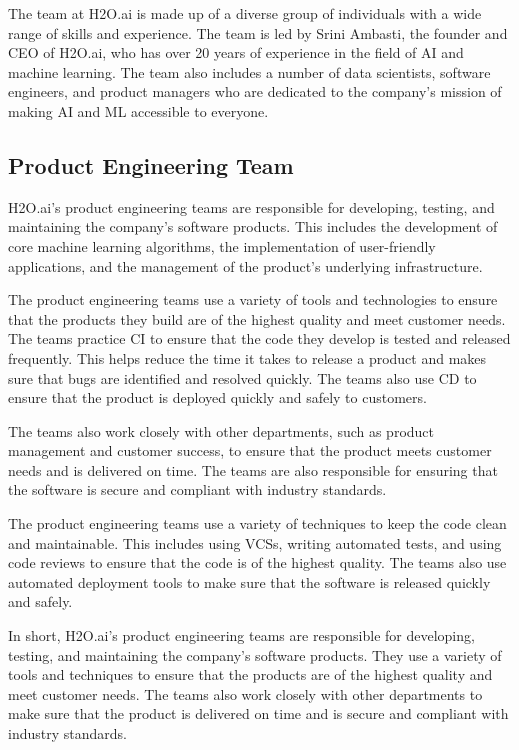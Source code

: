 \documentclass[12pt,a4paper]{report}
\begin{document}
The team at H2O.ai is made up of a diverse group of individuals with a wide range of 
skills and experience. The team is led by Srini Ambasti, the founder and CEO of H2O.ai, 
who has over 20 years of experience in the field of \ac{AI} and machine learning. 
The team also includes a number of data scientists, software engineers, and product managers 
who are dedicated to the company's mission of making AI and ML accessible to everyone.

\subsection {Product Engineering Team}
H2O.ai's product engineering teams are responsible for developing, testing, and maintaining the company's software products. This includes the development of core machine learning algorithms, the implementation of user-friendly applications, and the management of the product's underlying infrastructure.

The product engineering teams use a variety of tools and technologies to ensure that the products they build are of the highest quality and meet customer needs. The teams practice \ac{CI} to ensure that the code they develop is tested and released frequently. This helps reduce the time it takes to release a product and makes sure that bugs are identified and resolved quickly. The teams also use \ac{CD} to ensure that the product is deployed quickly and safely to customers.

The teams also work closely with other departments, such as product management and customer success, to ensure that the product meets customer needs and is delivered on time. The teams are also responsible for ensuring that the software is secure and compliant with industry standards.

The product engineering teams use a variety of techniques to keep the code clean and maintainable. This includes using \ac{VCS}s, writing automated tests, and using code reviews to ensure that the code is of the highest quality. The teams also use automated deployment tools to make sure that the software is released quickly and safely.

In short, H2O.ai's product engineering teams are responsible for developing, testing, and maintaining the company's software products. They use a variety of tools and techniques to ensure that the products are of the highest quality and meet customer needs. The teams also work closely with other departments to make sure that the product is delivered on time and is secure and compliant with industry standards.
\end{document}
